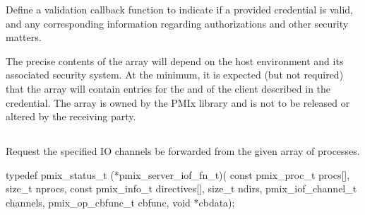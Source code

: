 \descr

Define a validation callback function to indicate if a provided credential is valid, and any corresponding information regarding authorizations and other security matters.

\adviceuserstart
The precise contents of the array will depend on the host environment and its associated security system. At the minimum, it is expected (but not required) that the array will contain entries for the  and  of the client described in the credential. The  array is owned by the \ac{PMIx} library and is not to be released or altered by the receiving party.
\adviceuserend


\subsection{}

\summary

Request the specified IO channels be forwarded from the given array of processes.

\format

\cspecificstart
\begin{codepar}
typedef pmix_status_t (*pmix_server_iof_fn_t)(
                        const pmix_proc_t procs[],
                        size_t nprocs,
                        const pmix_info_t directives[],
                        size_t ndirs,
                        pmix_iof_channel_t channels,
                        pmix_op_cbfunc_t cbfunc, void *cbdata);
\end{codepar}
\cspecificend

\begin{arglist}
\end{arglist}

